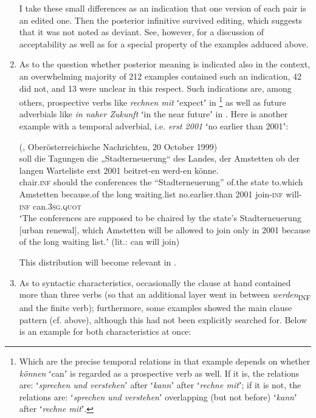 \documentclass[output=paper,hidelinks]{langscibook}
\begin{document}
\begin{enumerate}[label=(\roman*)]
\pagebreak I take these small differences as an indication that one version of each pair is an edited one. Then the posterior infinitive survived editing, which suggests that it was not noted as deviant. See, however,  for a discussion of acceptability as well as for a special property of the examples adduced above.

\item As to the question whether posterior meaning is indicated also in the context, an overwhelming majority of 212 examples contained such an indication, 42 did not, and 13 were unclear in this respect. Such indications are, among others, prospective verbs \citep{Reiner2013} like \emph{rechnen mit} ʻexpectʼ in \footnote{Which are the precise temporal relations in that example depends on whether \textit{können} ʻcanʼ is regarded as a prospective verb as well. If it is, the relations are: ʻ\emph{sprechen und verstehen}ʼ after ʻ\emph{kann}ʼ after ʻ\emph{rechne mit}ʼ; if it is not, the relations are: ʻ\emph{sprechen und verstehen}ʼ overlapping (but not before) ʻ\emph{kann}ʼ after ʻ\emph{rechne mit}ʼ.} as well as future adverbials like \emph{in naher Zukunft} ʻin the near futureʼ in . Here is another example with a temporal adverbial, i.e. \emph{erst 2001} ʻno earlier than 2001ʼ:

\ea\label{ex:reiner:29} 	 (, Oberösterreichische Nachrichten, 20 October 1999) \\
	{soll}		{die}	{Tagungen}		{die} {„Stadterneuerung“}		{des}		{Landes,} {der}		{Amstetten}	{ob}		{der}	{langen} {Warteliste}	{erst}				{2001} {beitret-en}	{werd-en}	{könne.}\\
chair.\textsc{inf}	should		the	conferences		the ``Stadterneuerung''		of.the		state to.which		Amstetten	because.of	the	long waiting.list	no.earlier.than		2001 join-\textsc{inf}		will-\textsc{inf}	can.\textsc{3sg}.\textsc{quot}\\
\glt ʻThe conferences are supposed to be chaired by the state’s Stadterneuerung [urban renewal], which Amstetten will be allowed to join only in 2001 because of the long waiting list.ʼ (lit.: can will join)
\z 

This distribution will become relevant in .

\item \begin{sloppypar} As to syntactic characteristics, occasionally the clause at hand contained more than three verbs (so that an additional layer went in between \textit{werden}\textsubscript{INF} and the finite verb); furthermore, some examples showed the main clause pattern (cf.  above), although this had not been explicitly searched for. Below is an example for both characteristics at once:\end{sloppypar}




\end{enumerate}
\end{document}
